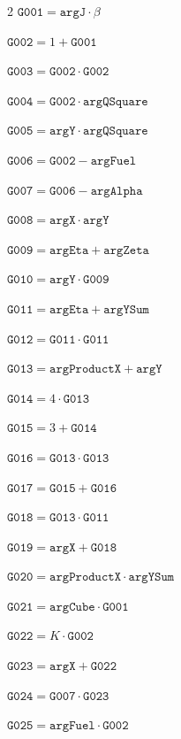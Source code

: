 \documentclass[10pt]{article}
\begin{document}
\begin{multicols}{2}\fontsize{8}{9}\selectfont
\noindent $\mathtt{G001}=\mathtt{argJ}\cdot \beta$\par
\noindent $\mathtt{G002}=1+\mathtt{G001}$\par
\noindent $\mathtt{G003}=\mathtt{G002}\cdot \mathtt{G002}$\par
\noindent $\mathtt{G004}=\mathtt{G002}\cdot \mathtt{argQSquare}$\par
\noindent $\mathtt{G005}=\mathtt{argY}\cdot \mathtt{argQSquare}$\par
\noindent $\mathtt{G006}=\mathtt{G002}-\mathtt{argFuel}$\par
\noindent $\mathtt{G007}=\mathtt{G006}-\mathtt{argAlpha}$\par
\noindent $\mathtt{G008}=\mathtt{argX}\cdot \mathtt{argY}$\par
\noindent $\mathtt{G009}=\mathtt{argEta}+\mathtt{argZeta}$\par
\noindent $\mathtt{G010}=\mathtt{argY}\cdot \mathtt{G009}$\par
\noindent $\mathtt{G011}=\mathtt{argEta}+\mathtt{argYSum}$\par
\noindent $\mathtt{G012}=\mathtt{G011}\cdot \mathtt{G011}$\par
\noindent $\mathtt{G013}=\mathtt{argProductX}+\mathtt{argY}$\par
\noindent $\mathtt{G014}=4\cdot \mathtt{G013}$\par
\noindent $\mathtt{G015}=3+\mathtt{G014}$\par
\noindent $\mathtt{G016}=\mathtt{G013}\cdot \mathtt{G013}$\par
\noindent $\mathtt{G017}=\mathtt{G015}+\mathtt{G016}$\par
\noindent $\mathtt{G018}=\mathtt{G013}\cdot \mathtt{G011}$\par
\noindent $\mathtt{G019}=\mathtt{argX}+\mathtt{G018}$\par
\noindent $\mathtt{G020}=\mathtt{argProductX}\cdot \mathtt{argYSum}$\par
\noindent $\mathtt{G021}=\mathtt{argCube}\cdot \mathtt{G001}$\par
\noindent $\mathtt{G022}=K\cdot \mathtt{G002}$\par
\noindent $\mathtt{G023}=\mathtt{argX}+\mathtt{G022}$\par
\noindent $\mathtt{G024}=\mathtt{G007}\cdot \mathtt{G023}$\par
\noindent $\mathtt{G025}=\mathtt{argFuel}\cdot \mathtt{G002}$\par

\end{multicols}
\end{document}
